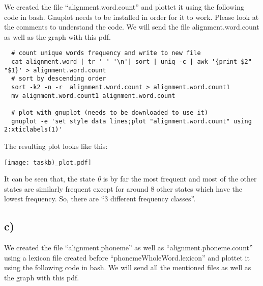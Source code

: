 We created the file ``alignment.word.count'' and plottet it using the following code in bash. Gnuplot needs 
to be installed in order for it to work. Please look at the comments to understand the code.
We will send the file alignment.word.count as well as the graph with this pdf.

\begin{lstlisting}
  # count unique words frequency and write to new file
  cat alignment.word | tr ' ' '\n'| sort | uniq -c | awk '{print $2" "$1}' > alignment.word.count
  # sort by descending order
  sort -k2 -n -r  alignment.word.count > alignment.word.count1
  mv alignment.word.count1 alignment.word.count

  # plot with gnuplot (needs to be downloaded to use it)
  gnuplot -e 'set style data lines;plot "alignment.word.count" using 2:xticlabels(1)'
\end{lstlisting}

The resulting plot looks like this: 

\texttt{[image: taskb)\_plot.pdf]}

It can be seen that, the state \emph{0} is by far the most frequent and most of the other states are similarly frequent except 
for around 8 other states which have the lowest frequency. So, there are ``3 different frequency classes''.


\subsection*{c)} %
\label{sub:c_}

We created the file ``alignment.phoneme'' as well as ``alignment.phoneme.count'' using a lexicon file created before ``phonemeWholeWord.lexicon'' and plottet it using the following code in bash. 
We will send all the mentioned files as well as the graph with this pdf.


